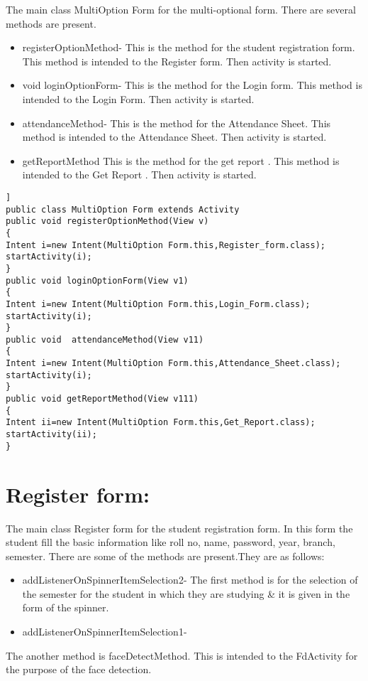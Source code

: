 The main class MultiOption Form for the multi-optional form. There are several methods are present.

\begin{itemize}
\item registerOptionMethod-
This is the method for the student registration form. This method is intended to the Register form. Then activity is started.
\item void loginOptionForm-
This is the method for the Login form. This method is intended to the Login Form. Then activity is started.
\item attendanceMethod-
This is the method for the Attendance Sheet. This method is intended to the Attendance Sheet. Then activity is started.
\item getReportMethod
This is the method for the get report . This method is intended to the Get Report . Then activity is started.
\end{itemize}

\begin{lstlisting}]
public class MultiOption Form extends Activity
public void registerOptionMethod(View v)
{
Intent i=new Intent(MultiOption Form.this,Register_form.class);
startActivity(i);
}
public void loginOptionForm(View v1)
{
Intent i=new Intent(MultiOption Form.this,Login_Form.class);
startActivity(i);
}
public void  attendanceMethod(View v11)
{
Intent i=new Intent(MultiOption Form.this,Attendance_Sheet.class);
startActivity(i);
}
public void getReportMethod(View v111)
{
Intent ii=new Intent(MultiOption Form.this,Get_Report.class);
startActivity(ii);
}
\end{lstlisting}

\section{Register form:}
The main class Register form for the student registration form. In this form the student fill the basic information like roll no, name, password, year, branch, semester. There are some of the methods are present.They are as follows:
\begin{itemize}
\item addListenerOnSpinnerItemSelection2-
The first method is for the selection of the semester for the student in which they are studying \& it is given in the form of the spinner.
\item  addListenerOnSpinnerItemSelection1-
\end{itemize}

The another method is faceDetectMethod. This is intended to the FdActivity for the purpose of the face detection.

